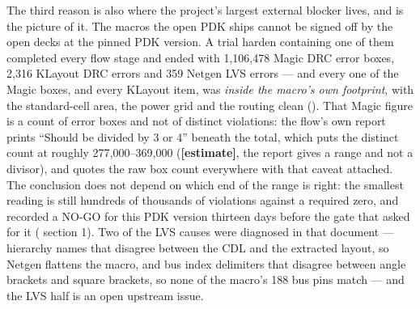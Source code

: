 The third reason is also where the project's largest external blocker
lives, and  is the picture of it. The macros the
open PDK ships cannot be signed off by the open decks at the pinned PDK
version. A trial harden containing one of them completed every flow
stage and ended with 1{,}106{,}478 Magic DRC error boxes, 2{,}316
KLayout DRC errors and 359 Netgen LVS errors --- and every one of the
Magic boxes, and every KLayout item, was \emph{inside the macro's own
footprint}, with the standard-cell area, the power grid and the routing
clean (). That Magic figure is a count of error
boxes and not of distinct violations: the flow's own report prints
``Should be divided by 3 or 4'' beneath the total, which puts the
distinct count at roughly 277{,}000--369{,}000 (\textbf{[estimate]}, the
report gives a range and not a divisor), and 
quotes the raw box count everywhere with that caveat attached. The
conclusion does not depend on which end of the range is right: the
smallest reading is still hundreds of thousands of violations against a
required zero, and  recorded a NO-GO for this PDK
version thirteen days before the gate that asked for it (
section 1). Two of the LVS
causes were diagnosed in that document --- hierarchy names that disagree
between the CDL and the extracted layout, so Netgen flattens the macro,
and bus index delimiters that disagree between angle brackets and square
brackets, so none of the macro's 188 bus pins match --- and the LVS half
is an open upstream issue.

